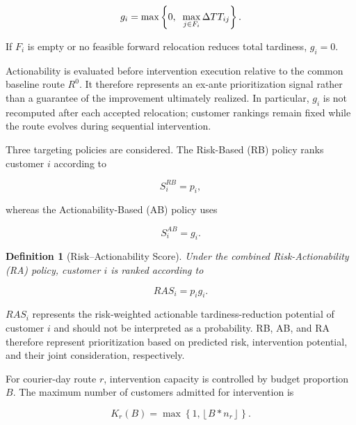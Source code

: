\documentclass[11pt,a4paper]{article}
\newtheorem{definition}{Definition}
\begin{document}
\begin{equation}
g_{i} = \max\left\{ 0,\text{\:\,}\max_{j \in F_{i}}\Delta TT_{ij} \right\}.
\label{eq:9}
\end{equation}

If \(F_{i}\) is empty or no feasible forward relocation reduces total
tardiness, \(g_{i} = 0\).

Actionability is evaluated before intervention execution relative to the
common baseline route \(R^{0}\). It therefore represents an ex-ante
prioritization signal rather than a guarantee of the improvement
ultimately realized. In particular, \(g_{i}\) is not recomputed after
each accepted relocation; customer rankings remain fixed while the route
evolves during sequential intervention.

Three targeting policies are considered. The Risk-Based (RB) policy
ranks customer \(i\) according to

\begin{equation}
S_{i}^{RB} = p_{i},
\label{eq:10}
\end{equation}

whereas the Actionability-Based (AB) policy uses

\begin{equation}
S_{i}^{AB} = g_{i}.
\label{eq:11}
\end{equation}

\begin{definition}[Risk--Actionability Score]
Under the combined Risk-Actionability (RA) policy, customer \(i\) is ranked
according to

\begin{equation}
RAS_{i} = p_{i}g_{i}.
\label{eq:12}
\end{equation}
\end{definition}

\(RAS_{i}\) represents the risk-weighted actionable tardiness-reduction
potential of customer \(i\) and should not be interpreted as a
probability. RB, AB, and RA therefore represent prioritization based on
predicted risk, intervention potential, and their joint consideration,
respectively.

For courier-day route \(r\), intervention capacity is controlled by
budget proportion \(B\). The maximum number of customers admitted for
intervention is

\begin{equation}
K_{r}(B) = \max\left\{ 1,\left\lfloor B*n_{r} \right\rfloor \right\}.
\label{eq:13}
\end{equation}
\end{document}
